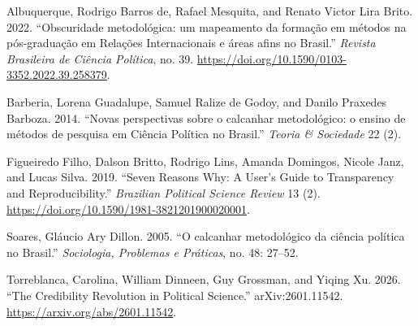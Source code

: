 \documentclass[
]{article}
\newlength{\cslhangindent}
\newenvironment{CSLReferences}[2] %
 {\begin{list}{}{%
  \setlength{\itemindent}{0pt}
  \setlength{\leftmargin}{0pt}
  \setlength{\parsep}{0pt}
  \ifodd #1
   \setlength{\leftmargin}{\cslhangindent}
   \setlength{\itemindent}{-1\cslhangindent}
  \fi
  \setlength{\itemsep}{#2\baselineskip}}}
 {\end{list}}
\begin{document}
\protect{}\label{refs}
\begin{CSLReferences}{1}{0}
Albuquerque, Rodrigo Barros de, Rafael Mesquita, and Renato Victor Lira
Brito. 2022. {``{Obscuridade metodológica: um mapeamento da formação em
métodos na pós-graduação em Relações Internacionais e áreas afins no
Brasil}.''} \emph{Revista Brasileira de Ciência Política}, no. 39.
\url{https://doi.org/10.1590/0103-3352.2022.39.258379}.

Barberia, Lorena Guadalupe, Samuel Ralize de Godoy, and Danilo Praxedes
Barboza. 2014. {``{Novas perspectivas sobre o calcanhar metodológico: o
ensino de métodos de pesquisa em Ciência Política no Brasil}.''}
\emph{Teoria \& Sociedade} 22 (2).

Figueiredo Filho, Dalson Britto, Rodrigo Lins, Amanda Domingos, Nicole
Janz, and Lucas Silva. 2019. {``Seven Reasons Why: A User's Guide to
Transparency and Reproducibility.''} \emph{Brazilian Political Science
Review} 13 (2). \url{https://doi.org/10.1590/1981-3821201900020001}.

Soares, Gláucio Ary Dillon. 2005. {``{O calcanhar metodológico da
ciência política no Brasil}.''} \emph{Sociologia, Problemas e Práticas},
no. 48: 27--52.

Torreblanca, Carolina, William Dinneen, Guy Grossman, and Yiqing Xu.
2026. {``The Credibility Revolution in Political Science.''}
arXiv:2601.11542. \url{https://arxiv.org/abs/2601.11542}.

\end{CSLReferences}
\end{document}
